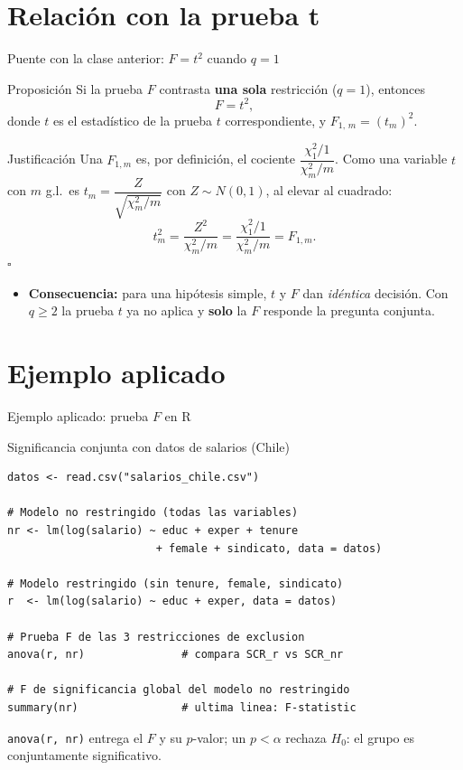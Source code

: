 \documentclass{beamer}
\begin{document}
\section{Relación con la prueba t}

\begin{frame}{Puente con la clase anterior: $F = t^2$ cuando $q=1$}
\begin{alertblock}{Proposición}
Si la prueba $F$ contrasta \textbf{una sola} restricción ($q=1$), entonces
\[
   F = t^2,
\]
donde $t$ es el estadístico de la prueba $t$ correspondiente, y $F_{1,\,m} = (t_m)^2$.
\end{alertblock}

\begin{exampleblock}{Justificación}
Una $F_{1,m}$ es, por definición, el cociente $\dfrac{\chi^2_1/1}{\chi^2_m/m}$. Como una variable $t$ con $m$ g.l.\ es $t_m = \dfrac{Z}{\sqrt{\chi^2_m/m}}$ con $Z\sim N(0,1)$, al elevar al cuadrado:
\[
   t_m^2 = \frac{Z^2}{\chi^2_m/m} = \frac{\chi^2_1/1}{\chi^2_m/m} = F_{1,m}.
\]
\hfill $\square$
\end{exampleblock}

\begin{itemize}
    \item \textbf{Consecuencia:} para una hipótesis simple, $t$ y $F$ dan \emph{idéntica} decisión. Con $q\geq 2$ la prueba $t$ ya no aplica y \textbf{solo} la $F$ responde la pregunta conjunta.
\end{itemize}
\end{frame}

\section{Ejemplo aplicado}

\begin{frame}[fragile]{Ejemplo aplicado: prueba $F$ en R}
\begin{exampleblock}{Significancia conjunta con datos de salarios (Chile)}
\begin{verbatim}
datos <- read.csv("salarios_chile.csv")

# Modelo no restringido (todas las variables)
nr <- lm(log(salario) ~ educ + exper + tenure
                       + female + sindicato, data = datos)

# Modelo restringido (sin tenure, female, sindicato)
r  <- lm(log(salario) ~ educ + exper, data = datos)

# Prueba F de las 3 restricciones de exclusion
anova(r, nr)               # compara SCR_r vs SCR_nr

# F de significancia global del modelo no restringido
summary(nr)                # ultima linea: F-statistic
\end{verbatim}
\end{exampleblock}
{\small \texttt{anova(r, nr)} entrega el $F$ y su $p$-valor; un $p < \alpha$ rechaza $H_0$: el grupo es conjuntamente significativo.}
\end{frame}
\end{document}
